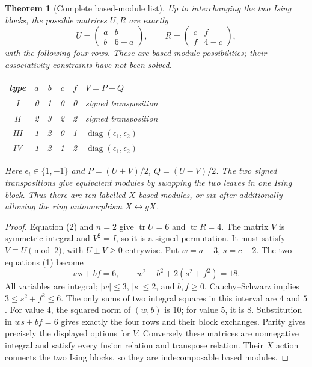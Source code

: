 \documentclass[11pt]{article}
\newtheorem{theorem}{Theorem}\newtheorem{lemma}{Lemma}\newtheorem{corollary}{Corollary}
\begin{document}
\begin{theorem}[Complete based-module list]
Up to interchanging the two Ising blocks, the possible matrices $U,R$
are exactly
\[
U=\begin{pmatrix}a&b\\b&6-a\end{pmatrix},\qquad
R=\begin{pmatrix}c&f\\f&4-c\end{pmatrix},
\]
with the following four rows. These are based-module possibilities;
their associativity constraints have not been solved.
\begin{center}
\begin{tabular}{c|rrrr|l}
type&$a$&$b$&$c$&$f$&$V=P-Q$\\\hline
I&0&1&0&0&signed transposition\\
II&2&3&2&2&signed transposition\\
III&1&2&0&1&$\operatorname{diag}(\epsilon_1,\epsilon_2)$\\
IV&1&2&1&2&$\operatorname{diag}(\epsilon_1,\epsilon_2)$
\end{tabular}
\end{center}
Here $\epsilon_i\in\{1,-1\}$ and $P=(U+V)/2$, $Q=(U-V)/2$.
The two signed transpositions give equivalent modules by swapping the
two leaves in one Ising block. Thus there are ten labelled-$X$ based
modules, or six after additionally allowing the ring automorphism
$X\leftrightarrow gX$.
\end{theorem}
\begin{proof}
Equation (2) and $n=2$ give $\operatorname{tr}U=6$ and
$\operatorname{tr}R=4$. The matrix $V$ is symmetric integral and
$V^2=I$, so it is a signed permutation. It must satisfy
$V\equiv U\pmod2$, with $U\pm V\geq0$ entrywise.
Put $w=a-3$, $s=c-2$. The two equations (1) become
\[
ws+bf=6,\qquad w^2+b^2+2(s^2+f^2)=18. \tag{3}
\]
All variables are integral; $|w|\leq3$, $|s|\leq2$, and $b,f\geq0$.
Cauchy--Schwarz implies $3\leq s^2+f^2\leq6$.
The only sums of two integral squares in this interval are $4$ and $5$.
For value $4$, the squared norm of $(w,b)$ is $10$; for value $5$, it
is $8$. Substitution in $ws+bf=6$ gives exactly the four rows and their
block exchanges. Parity gives precisely the displayed options for $V$.
Conversely these matrices are nonnegative integral and satisfy every
fusion relation and transpose relation. Their $X$ action connects the
two Ising blocks, so they are indecomposable based modules.
\end{proof}
\end{document}
